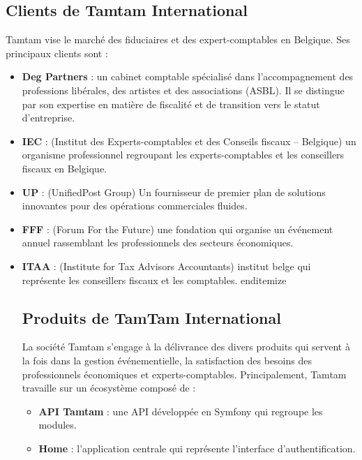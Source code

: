 \begin{itemize}
\subsection{Clients de Tamtam International}

Tamtam vise le marché des fiduciaires et des expert-comptables en Belgique. Ses principaux clients sont :

\begin{itemize}
    \item \textbf{Deg Partners} : un cabinet comptable spécialisé dans l'accompagnement des professions libérales, des artistes et des associations (ASBL). Il se distingue par son expertise en matière de fiscalité et de transition vers le statut d'entreprise.
    
    \item \textbf{IEC} : (Institut des Experts-comptables et des Conseils fiscaux – Belgique) un organisme professionnel regroupant les experts-comptables et les conseillers fiscaux en Belgique.
    
    \item \textbf{UP} : (UnifiedPost Group) Un fournisseur de premier plan de solutions innovantes pour des opérations commerciales fluides.
    
    \item \textbf{FFF} : (Forum For the Future) une fondation qui organise un événement annuel rassemblant les professionnels des secteurs économiques.
    
    \item \textbf{ITAA} : (Institute for Tax Advisors Accountants) institut belge qui représente les conseillers fiscaux et les comptables.
end{itemize}

\subsection{Produits de TamTam International}

La société Tamtam s'engage à la délivrance des divers produits qui servent à la fois dans la gestion événementielle, la satisfaction des besoins des professionnels économiques et experts-comptables. Principalement, Tamtam travaille sur un écosystème composé de :

\begin{itemize}
    \item \textbf{API Tamtam} : une API développée en Symfony qui regroupe les modules.
    
    \item \textbf{Home} : l'application centrale qui représente l'interface d'authentification.
    

\end{itemize}
\end{itemize}
\end{itemize}
